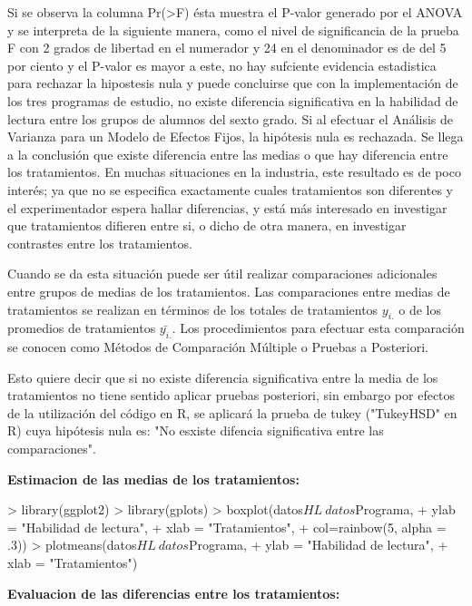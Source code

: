 \documentclass[12pt,letterpaper]{report}
\begin{document}
Si se observa la columna Pr(>F) ésta muestra el P-valor generado por el ANOVA y se interpreta de la siguiente manera, como el nivel de significancia de la prueba F con 2 grados de libertad en el numerador y 24 en el denominador es de del 5 por ciento y el P-valor es mayor a este, no hay sufciente evidencia estadistica para rechazar la hipostesis nula y puede concluirse que con la implementación de los tres programas de estudio, no existe diferencia
significativa en la habilidad de lectura entre los grupos de alumnos del sexto grado.
\newpage
Si al efectuar el Análisis de Varianza para un Modelo de Efectos Fijos, la hipótesis nula es
rechazada. Se llega a la conclusión que existe diferencia entre las medias o que hay diferencia
entre los tratamientos. En muchas situaciones en la industria, este resultado es de poco
interés; ya que no se especifica exactamente cuales tratamientos son diferentes y el
experimentador espera hallar diferencias, y está más interesado en investigar que tratamientos
difieren entre si, o dicho de otra manera, en investigar contrastes entre los tratamientos.

Cuando se da esta situación puede ser útil realizar comparaciones adicionales entre grupos
de medias de los tratamientos. Las comparaciones entre medias de tratamientos se realizan en
términos de los totales de tratamientos $y_{i.}$ o de los promedios de tratamientos $\bar{y_{i.}}$. Los procedimientos para efectuar esta comparación se conocen como Métodos de Comparación
Múltiple o Pruebas a Posteriori.

Esto quiere decir que si no existe diferencia significativa entre la media de los tratamientos no tiene sentido aplicar pruebas posteriori, sin embargo por efectos de la utilización del código en R, se aplicará la prueba de tukey ("TukeyHSD" en R) cuya hipótesis nula es: "No esxiste difencia significativa entre las comparaciones".

\textbf{Estimacion de las medias de los tratamientos:}
\begin{Schunk}
\begin{Sinput}
> library(ggplot2)
> library(gplots)
> boxplot(datos$HL~datos$Programa,
+         ylab = "Habilidad de lectura",
+         xlab = "Tratamientos",
+         col=rainbow(5, alpha = .3))
> plotmeans(datos$HL~datos$Programa,
+           ylab = "Habilidad de lectura",
+           xlab = "Tratamientos")
\end{Sinput}
\end{Schunk}
\newpage
\textbf{Evaluacion de las diferencias entre los tratamientos:}
\end{document}
